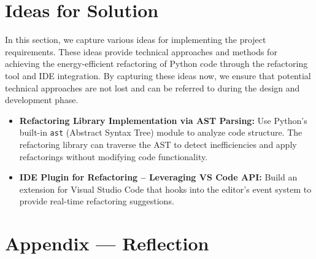 \documentclass[12pt]{article}
\begin{document}
\section{Ideas for Solution}
In this section, we capture various ideas for implementing the
project requirements. These ideas provide technical approaches and
methods for achieving the energy-efficient refactoring of Python code
through the refactoring tool and IDE integration. By capturing these
ideas now, we ensure that potential technical approaches are not lost
and can be referred to during the design and development phase.
\begin{itemize}
  \item \textbf{Refactoring Library Implementation via AST Parsing:}
    Use Python’s built-in \texttt{ast} (Abstract Syntax Tree) module
    to analyze code structure. The refactoring library can traverse
    the AST to detect inefficiencies and apply refactorings without
    modifying code functionality.
  \item \textbf{IDE Plugin for Refactoring – Leveraging VS Code API:}
    Build an extension for Visual Studio Code that hooks into the
    editor’s event system to provide real-time refactoring suggestions.
\end{itemize}

\newpage{}
\section*{Appendix --- Reflection}
\end{document}

